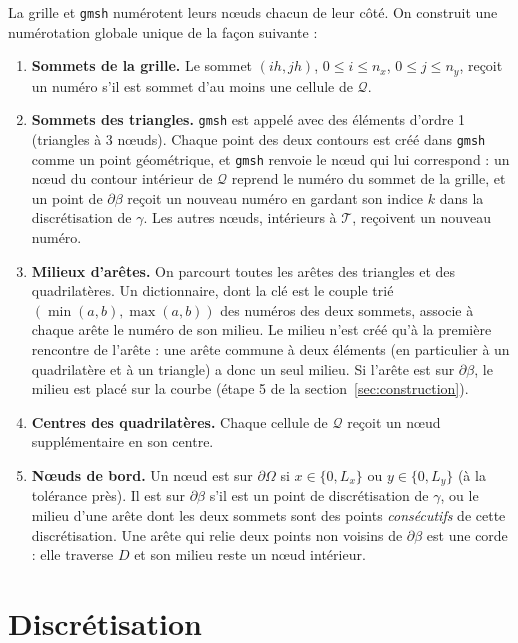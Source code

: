 \documentclass[11pt,a4paper]{article}
\begin{document}
La grille et \texttt{gmsh} numérotent leurs nœuds chacun de leur côté. On
construit une numérotation globale unique de la façon suivante :
\begin{enumerate}
  \item \textbf{Sommets de la grille.} Le sommet $(i h, j h)$,
        $0 \le i \le n_x$, $0 \le j \le n_y$, reçoit un numéro s'il est
        sommet d'au moins une cellule de $\mathcal{Q}$.
  \item \textbf{Sommets des triangles.} \texttt{gmsh} est appelé avec des
        éléments d'ordre 1 (triangles à 3 nœuds). Chaque point des deux
        contours est créé dans \texttt{gmsh} comme un point géométrique, et
        \texttt{gmsh} renvoie le nœud qui lui correspond : un nœud du
        contour intérieur de $\mathcal{Q}$ reprend le numéro du sommet de la
        grille, et un point de $\partial\beta$ reçoit un nouveau numéro en
        gardant son indice $k$ dans la discrétisation de $\gamma$. Les
        autres nœuds, intérieurs à $\mathcal{T}$, reçoivent un nouveau
        numéro.
  \item \textbf{Milieux d'arêtes.} On parcourt toutes les arêtes des
        triangles et des quadrilatères. Un dictionnaire, dont la clé est le
        couple trié $(\min(a,b), \max(a,b))$ des numéros des deux sommets,
        associe à chaque arête le numéro de son milieu. Le milieu n'est
        créé qu'à la première rencontre de l'arête : une arête commune à
        deux éléments (en particulier à un quadrilatère et à un triangle)
        a donc un seul milieu. Si l'arête est sur $\partial\beta$, le
        milieu est placé sur la courbe (étape 5 de la section~\ref{sec:construction}).
  \item \textbf{Centres des quadrilatères.} Chaque cellule de $\mathcal{Q}$
        reçoit un nœud supplémentaire en son centre.
  \item \textbf{Nœuds de bord.} Un nœud est sur $\partial\Omega$ si
        $x \in \{0, L_x\}$ ou $y \in \{0, L_y\}$ (à la tolérance près). Il
        est sur $\partial\beta$ s'il est un point de discrétisation de
        $\gamma$, ou le milieu d'une arête dont les deux sommets sont des
        points \emph{consécutifs} de cette discrétisation. Une arête qui
        relie deux points non voisins de $\partial\beta$ est une corde : elle
        traverse $D$ et son milieu reste un nœud intérieur.
\end{enumerate}

\section{Discrétisation}
\end{document}
